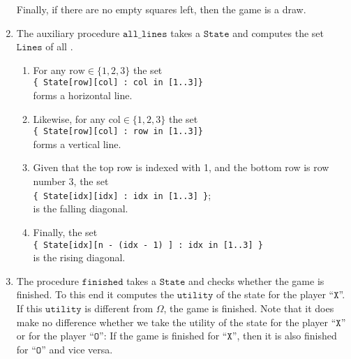 \begin{enumerate}
      Finally, if there are no empty squares left, then the game is a draw.
\item The auxiliary procedure $\mathtt{all\_lines}$ takes a $\mathtt{State}$ and computes the set $\mathtt{Lines}$ of all
      . 
      \begin{enumerate}
      \item For any $\mathrm{row} \in \{1,2,3\}$ the set 
            \\[0.2cm]
            \hspace*{1.3cm}
            \texttt{\{ State[row][col] : col in [1..3]\}} 
            \\[0.2cm]
            forms a horizontal line. 
      \item Likewise, for any $\mathrm{col} \in \{1,2,3\}$ the set 
            \\[0.2cm]
            \hspace*{1.3cm}
            \texttt{\{ State[row][col] : row in [1..3]\}} 
            \\[0.2cm]
            forms a vertical line. 
      \item Given that the top row is indexed with 1, and the bottom row is row number 3, the set
            \\[0.2cm]
            \hspace*{1.3cm}
            \texttt{\{ State[idx][idx] : idx in [1..3] \}};
            \\[0.2cm]
            is the falling diagonal.
      \item Finally, the set
            \\[0.2cm]
            \hspace*{1.3cm}
            \texttt{\{ State[idx][n - (idx - 1) ] : idx in [1..3] \}}
            \\[0.2cm]
            is the rising diagonal.
      \end{enumerate}
\item The procedure $\mathtt{finished}$ takes a $\mathtt{State}$ and checks whether the game is finished.
      To this end it computes the $\mathtt{utility}$ of the state for the player ``$\mathtt{X}$''.  
      If this $\mathtt{utility}$ is different from $\Omega$, the game is finished.  Note that it does make no
      difference whether we take the utility of the state for the player ``$\mathtt{X}$'' or for the player
      ``$\mathtt{O}$'': If the game is finished for  ``$\mathtt{X}$'', then it is also finished for ``$\mathtt{O}$'' and vice versa.
\end{enumerate}

